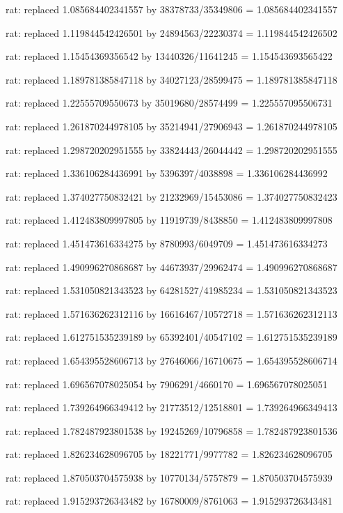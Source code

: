 \documentclass[a4paper,10pt]{article}
\begin{document}
\begin{eulernotebook}
\begin{eulercomment}
\begin{eulercomment}
\begin{eulercomment}
\begin{eulercomment}
\begin{eulercomment}
\begin{eulercomment}
\begin{eulercomment}
\begin{eulercomment}
\begin{eulercomment}
\begin{eulercomment}
\begin{eulercomment}
\begin{eulercomment}
\begin{eulercomment}
\begin{eulercomment}
\begin{eulercomment}
\begin{eulercomment}
\begin{euleroutput}
  rat: replaced 1.085684402341557 by 38378733/35349806 = 1.085684402341557
  
  rat: replaced 1.119844542426501 by 24894563/22230374 = 1.119844542426502
  
  rat: replaced 1.15454369356542 by 13440326/11641245 = 1.154543693565422
  
  rat: replaced 1.189781385847118 by 34027123/28599475 = 1.189781385847118
  
  rat: replaced 1.22555709550673 by 35019680/28574499 = 1.225557095506731
  
  rat: replaced 1.261870244978105 by 35214941/27906943 = 1.261870244978105
  
  rat: replaced 1.298720202951555 by 33824443/26044442 = 1.298720202951555
  
  rat: replaced 1.336106284436991 by 5396397/4038898 = 1.336106284436992
  
  rat: replaced 1.374027750832421 by 21232969/15453086 = 1.374027750832423
  
  rat: replaced 1.412483809997805 by 11919739/8438850 = 1.412483809997808
  
  rat: replaced 1.451473616334275 by 8780993/6049709 = 1.451473616334273
  
  rat: replaced 1.490996270868687 by 44673937/29962474 = 1.490996270868687
  
  rat: replaced 1.531050821343523 by 64281527/41985234 = 1.531050821343523
  
  rat: replaced 1.571636262312116 by 16616467/10572718 = 1.571636262312113
  
  rat: replaced 1.612751535239189 by 65392401/40547102 = 1.612751535239189
  
  rat: replaced 1.654395528606713 by 27646066/16710675 = 1.654395528606714
  
  rat: replaced 1.696567078025054 by 7906291/4660170 = 1.696567078025051
  
  rat: replaced 1.739264966349412 by 21773512/12518801 = 1.739264966349413
  
  rat: replaced 1.782487923801538 by 19245269/10796858 = 1.782487923801536
  
  rat: replaced 1.826234628096705 by 18221771/9977782 = 1.826234628096705
  
  rat: replaced 1.870503704575938 by 10770134/5757879 = 1.870503704575939
  
  rat: replaced 1.915293726343482 by 16780009/8761063 = 1.915293726343481
  

\end{euleroutput}
\end{eulercomment}
\end{eulercomment}
\end{eulercomment}
\end{eulercomment}
\end{eulercomment}
\end{eulercomment}
\end{eulercomment}
\end{eulercomment}
\end{eulercomment}
\end{eulercomment}
\end{eulercomment}
\end{eulercomment}
\end{eulercomment}
\end{eulercomment}
\end{eulercomment}
\end{eulercomment}
\end{eulernotebook}
\end{document}
